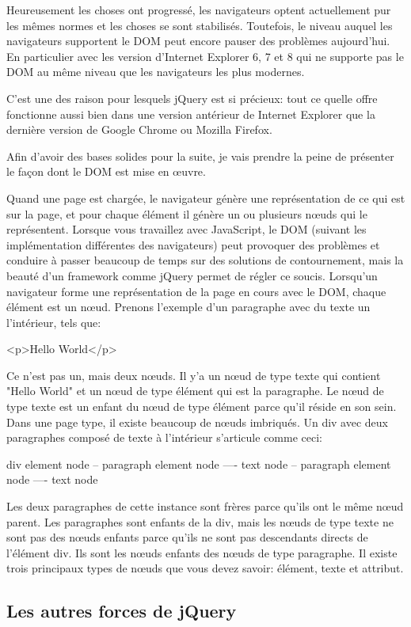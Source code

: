 Heureusement les choses ont progressé, les navigateurs optent actuellement pur les mêmes normes et les choses se sont stabilisés. Toutefois, le niveau auquel les navigateurs supportent le DOM peut encore pauser des problèmes aujourd'hui. En particulier avec les version d'Internet Explorer 6, 7 et 8 qui ne supporte pas le DOM au même niveau que les navigateurs les plus modernes. 

C'est une des raison pour lesquels jQuery est si précieux: tout ce quelle offre fonctionne aussi bien dans une version antérieur de Internet Explorer que la dernière version de Google Chrome ou Mozilla Firefox.

Afin d'avoir des bases solides pour la suite, je vais prendre la peine de présenter le façon dont le DOM est mise en œuvre.

Quand une page est chargée, le navigateur génère une représentation de ce qui est sur la page, et pour chaque élément il génère un ou plusieurs nœuds qui le représentent. Lorsque vous travaillez avec JavaScript, le DOM (suivant les implémentation différentes des navigateurs) peut provoquer des problèmes et conduire à passer beaucoup de temps sur des solutions de contournement, mais la beauté d'un framework comme jQuery permet de régler ce soucis.
Lorsqu'un navigateur forme une représentation de la page en cours avec le DOM, chaque élément est un nœud. Prenons l'exemple d'un paragraphe avec du texte un l'intérieur, tels que:

<p>Hello World</p>

Ce n'est pas un, mais deux nœuds. Il y'a un nœud de type texte qui contient "Hello World" et un nœud de type élément qui est la paragraphe. Le nœud de type texte est un enfant du nœud de type élément parce qu'il réside en son sein. Dans une page type, il existe beaucoup de nœuds imbriqués. Un div avec deux paragraphes composé de texte à l'intérieur s'articule comme ceci: 

div element node
-- paragraph element node
---- text node
-- paragraph element node
---- text node

Les deux paragraphes de cette instance sont frères parce qu'ils ont le même nœud parent. Les paragraphes sont enfants de la div, mais les nœuds de type texte ne sont pas des nœuds enfants parce qu'ils ne sont pas descendants directs de l'élément div.
Ils sont les nœuds enfants des nœuds de type paragraphe. Il existe trois principaux types de nœuds que vous devez savoir: élément, texte et attribut. 

\subsection{Les autres forces de jQuery }

